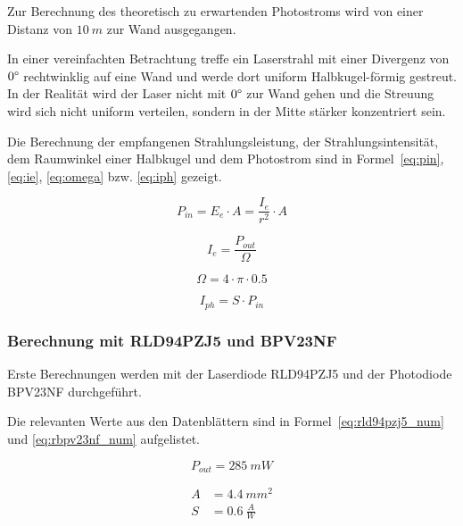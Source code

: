 Zur Berechnung des theoretisch zu erwartenden Photostroms wird von einer Distanz von $10~m$ zur Wand ausgegangen.

In einer vereinfachten Betrachtung treffe ein Laserstrahl mit einer Divergenz von $0\degree$ rechtwinklig auf eine Wand
und werde dort uniform Halbkugel-förmig gestreut. In der Realität wird der Laser nicht mit $0\degree$ zur Wand gehen und
die Streuung wird sich nicht uniform verteilen, sondern in der Mitte stärker konzentriert sein.

Die Berechnung der empfangenen Strahlungsleistung, der Strahlungsintensität, dem Raumwinkel einer Halbkugel und dem
Photostrom sind in Formel~\ref{eq:pin}, \ref{eq:ie}, \ref{eq:omega} bzw. \ref{eq:iph} gezeigt.

\begin{equation}\label{eq:pin}
    P_{in} = E_e \cdot A = \frac{I_e}{r^2} \cdot A
\end{equation}

\begin{equation}\label{eq:ie}
    I_e = \frac{P_{out}}{\Omega}
\end{equation}

\begin{equation}\label{eq:omega}
    \Omega = 4\cdot \pi \cdot 0.5
\end{equation}

\begin{equation}\label{eq:iph}
    I_{ph} = S \cdot P_{in}
\end{equation}

\subsubsection{Berechnung mit RLD94PZJ5 und BPV23NF}

Erste Berechnungen werden mit der Laserdiode RLD94PZJ5 \cite{rohm2020rld94pzj5_datasheet} und der Photodiode BPV23NF
\cite{vishay2024bpv23nf_datasheet} durchgeführt.

Die relevanten Werte aus den Datenblättern sind in Formel~\ref{eq:rld94pzj5_num} und \ref{eq:rbpv23nf_num} aufgelistet.

\begin{equation}\label{eq:rld94pzj5_num}
    P_{out} = 285~mW
\end{equation}

\begin{equation}\label{eq:rbpv23nf_num}
    \begin{split}
        A &= 4.4~mm^2\\
        S &= 0.6~\frac{A}{W}
    \end{split}
\end{equation}

